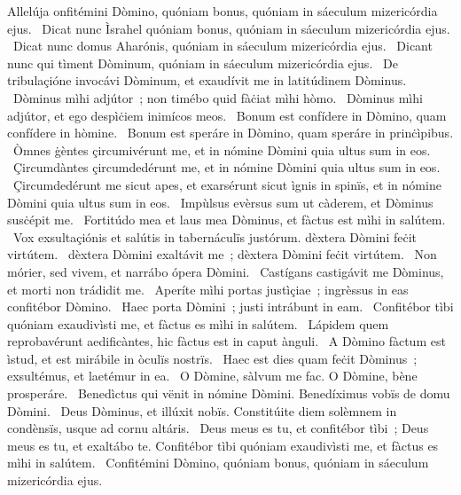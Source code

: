{ Allelúja}
{%
onfitémini Dòmino, quóniam bonus, quóniam in sáeculum mizericórdia ejus. 
~Dicat nunc Ìsrahel quóniam bonus, quóniam in sáeculum mizericórdia ejus. 
~Dicat nunc domus Aharónis, quóniam in sáeculum mizericórdia ejus. 
~Dicant nunc qui tìment Dòminum, quóniam in sáeculum mizericórdia ejus. 
~De tribulaçióne invocávi Dòminum, et exaudívit me in latitúdinem Dòminus. 
~Dòminus mìhi adjútor~; non timébo quid fàċiat mìhi hòmo. 
~Dòminus mìhi adjútor, et ego despìċiem inimícos meos. 
~Bonum est confídere in Dòmino, quam confídere in hòmine. 
~Bonum est speráre in Dòmino, quam speráre in prinċìpibus. 
~Òmnes ġèntes çircumivérunt me, et in nómine Dòmini quia ultus sum in eos. 
~Çircumdàntes çircumdedérunt me, et in nómine Dòmini quia ultus sum in eos. 
~Çircumdedérunt me sicut apes, et exarsérunt sicut ìgnis in spinïs, et in nómine Dòmini quia ultus sum in eos. 
~Impùlsus evèrsus sum ut càderem, et Dòminus susċépit me. 
~Fortitúdo mea et laus mea Dòminus, et fàctus est mìhi in salútem. 
~Vox exsultaçiónis et salútis in tabernáculïs justórum. dèxtera Dòmini feċit virtútem. 
~dèxtera Dòmini exaltávit me~; dèxtera Dòmini feċit virtútem. 
~Non mórier, sed vivem, et narrábo ópera Dòmini. 
~Castígans castigávit me Dòminus, et morti non trádidit me. 
~Aperíte mìhi portas justìçiae~; ingrèssus in eas confitébor Dòmino. 
~Haec porta Dòmini~; justi intrábunt in eam. 
~Confitébor tìbi quóniam exaudivìsti me, et fàctus es mìhi in salútem. 
~Lápidem quem reprobavérunt aedificàntes, hic fàctus est in caput ànguli. 
~A Dòmino fàctum est ìstud, et est mirábile in òculïs nostrïs. 
~Haec est dies quam feċit Dòminus~; exsultémus, et laetémur in ea. 
~O Dòmine, sàlvum me fac. O Dòmine, bène prosperáre. 
~Benedìctus qui vënit in nómine Dòmini. Benedíximus vobïs de domu Dòmini. 
~Deus Dòminus, et illúxit nobïs. Constitúite diem solèmnem in condènsïs, usque ad cornu altáris. 
~Deus meus es tu, et confitébor tìbi~; Deus meus es tu, et exaltábo te. Confitébor tìbi quóniam exaudivìsti me, et fàctus es mìhi in salútem. 
~Confitémini Dòmino, quóniam bonus, quóniam in sáeculum mizericórdia ejus. 
}
